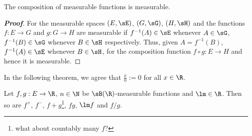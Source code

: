 \begin{proposition}\label{pro:composition_measurable}
The composition of measurable functions is measurable.
\end{proposition}
\begin{proof}[\bf Proof]
For the measurable spaces $(E,\sE)$, $(G,\sG)$, $(H,\sH)$ and the functions $f : E \to G$ and $g : G \to H$  are measurable if $f^{-1}(A) \in\sE$ whenever $A \in \sG$, $f^{-1}(B) \in\sG$ whenever $B \in \sH$ respectively. Thus, given $A = f^{-1}(B)$, $f^{-1}(A) \in\sE$ whenever $B \in \sH$, for the composition function $f\circ g : E\to H$ and hence it is measurable.
\end{proof}

In the following theorem, we agree that $\frac x0 := 0$ for all $x\in \R$.

\begin{theorem}\label{thm:measurable_function_property}
Let $f,g : E \to \R$, $n \in \N$ be $\sB(\R)$-measurable functions and $\lm \in \R$. Then so are $f^+$, $f^-$, $f+g$\footnote{what about countably many $f$?}, $fg$, $\lm f$ and $f/g$.
\end{theorem}


